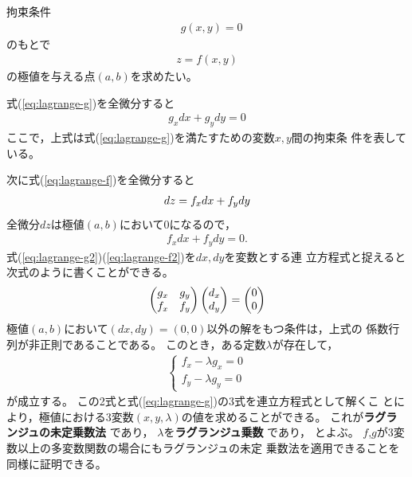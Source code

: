 \documentclass[twocolumn,11pt]{jarticle}
\begin{document}
拘束条件
\begin{align}
\label{eq:lagrange-g}
&g(x,y)=0
\end{align}
のもとで
\begin{align}
\label{eq:lagrange-f}
z=f(x,y)
\end{align}
の極値を与える点$(a,b)$を求めたい。

式(\ref{eq:lagrange-g})を全微分すると
\begin{align}
  \label{eq:lagrange-g2}
  g_{x}dx+g_{y}dy=0
\end{align}
ここで，上式は式(\ref{eq:lagrange-g})を満たすための変数$x,y$間の拘束条
件を表している。

次に式(\ref{eq:lagrange-f})を全微分すると
\begin{align}
  dz=f_{x}dx+f_{y}dy\notag
\end{align}
全微分$dz$は極値$(a,b)$において0になるので，
\begin{align}
  \label{eq:lagrange-f2}
  f_{x}dx+f_{y}dy=0.
\end{align}
式(\ref{eq:lagrange-g2})(\ref{eq:lagrange-f2})を$dx,dy$を変数とする連
立方程式と捉えると次式のように書くことができる。
\begin{align}
  \begin{pmatrix}
    g_x & g_y\\
    f_x & f_y
  \end{pmatrix}
  \begin{pmatrix}
    d_x \\ d_y
  \end{pmatrix}
  =
  \begin{pmatrix}
    0 \\ 0
  \end{pmatrix}\notag
\end{align}
極値$(a,b)$において$(dx,dy)=(0,0)$以外の解をもつ条件は，上式の
係数行列が非正則であることである。
このとき，ある定数$\lambda$が存在して，
\begin{align}
\label{eq:lagrange}
  \begin{cases}
  f_x-\lambda g_x=0\\
  f_y-\lambda g_y=0
  \end{cases}
\end{align}
が成立する。
この2式と式(\ref{eq:lagrange-g})の3式を連立方程式として解くこ
とにより，極値における3変数$(x,y,\lambda)$の値を求めることができる。
これが\textbf{ラグランジュの未定乗数法}
であり，
$\lambda$を\textbf{ラグランジュ乗数}
であり，
とよぶ。
$f$,$g$が3変数以上の多変数関数の場合にもラグランジュの未定
乗数法を適用できることを同様に証明できる。
\end{document}
